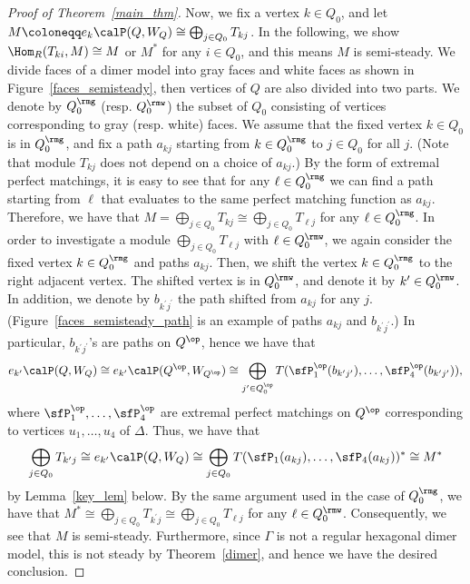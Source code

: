 \begin{proof}[Proof of Theorem~\ref{main_thm}]
Now, we fix a vertex $k\in Q_0$, and let $M\coloneqq e_k\calP(Q, W_Q)\cong\bigoplus_{j\in Q_0}T_{kj}$. In the following, we show $\Hom_R(T_{ki},M)\cong M$ or $M^*$ for any $i\in Q_0$, and this means $M$ is semi-steady. We divide faces of a dimer model into gray faces and white faces as shown in Figure~\ref{faces_semisteady}, then vertices of $Q$ are also divided into two parts. We denote by $Q_0^{\rmg}$ (resp. $Q_0^{\rmw}$) the subset of $Q_0$ consisting of vertices corresponding to gray (resp. white) faces. We assume that the fixed vertex $k\in Q_0$ is in $Q_0^{\rmg}$, and fix a path $a_{kj}$ starting from $k\in Q_0^{\rmg}$ to $j\in Q_0$ for all $j$. (Note that module $T_{kj}$ does not depend on a choice of $a_{kj}$.) By the form of extremal perfect matchings, it is easy to see that for any $\ell\in Q_0^{\rmg}$ we can find a path starting from $\ell$ that evaluates to the same perfect matching function as $a_{kj}$. Therefore, we have that $M=\bigoplus_{j\in Q_0}T_{kj}\cong\bigoplus_{j\in Q_0}T_{\ell j}$ for any $\ell\in Q_0^{\rmg}$. In order to investigate a module $\bigoplus_{j\in Q_0}T_{\ell j}$ with $\ell\in Q_0^{\rmw}$, we again consider the fixed vertex $k\in Q_0^{\rmg}$ and paths $a_{kj}$. Then, we shift the vertex $k\in Q_0^{\rmg}$ to the right adjacent vertex. The shifted vertex is in $Q_0^{\rmw}$, and denote it by $k^\prime\in Q_0^{\rmw}$. In addition, we denote by $b_{k^\prime j^\prime}$ the path shifted from $a_{kj}$ for any $j$. (Figure~\ref{faces_semisteady_path} is an example of paths $a_{kj}$ and $b_{k^\prime j^\prime}$.) In particular, $b_{k^\prime j^\prime}$'s are paths on $Q^{\op}$, hence we have that
\[
e_{k^\prime}\calP(Q,W_Q)\cong e_{k^\prime}\calP(Q^{\op},W_{Q^{\op}})
\cong\bigoplus_{j^\prime\in Q_0^{\op}} T(\sfP^{\op}_1(b_{k^\prime j^\prime}),\dots,\sfP^{\op}_4(b_{k^\prime j^\prime})),
\]
where $\sfP^{\op}_1,\dots,\sfP^{\op}_4$ are extremal perfect matchings on $Q^{\op}$ corresponding to vertices $u_1,\dots,u_4$ of $\Delta$. Thus, we have that
\[
\bigoplus_{j\in Q_0}T_{k^\prime j}\cong e_{k^\prime}\calP(Q,W_Q)\cong\bigoplus_{j\in Q_0}T(\sfP_1(a_{kj}),\dots,\sfP_4(a_{kj}))^*\cong M^*
\]
by Lemma~\ref{key_lem} below. By the same argument used in the case of $Q_0^{\rmg}$, we have that $M^*\cong\bigoplus_{j\in Q_0}T_{k^\prime j}\cong\bigoplus_{j\in Q_0}T_{\ell j}$ for any $\ell\in Q_0^{\rmw}$. Consequently, we see that $M$ is semi-steady. Furthermore, since $\Gamma$ is not a regular hexagonal dimer model, this is not steady by Theorem~\ref{dimer}, and hence we have the desired conclusion.



\end{proof}
